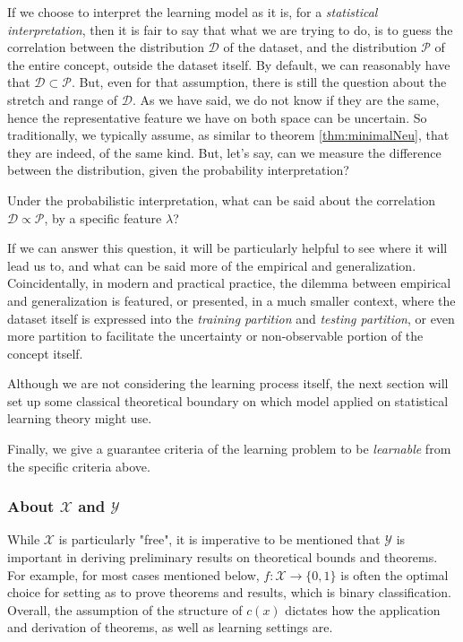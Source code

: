 If we choose to interpret the learning model as it is, for a \textit{statistical interpretation}, then it is fair to say that what we are trying to do, is to guess the correlation between the distribution $\mathcal{D}$ of the dataset, and the distribution $\mathcal{P}$ of the entire concept, outside the dataset itself. By default, we can reasonably have that $\mathcal{D}\subset \mathcal{P}$. But, even for that assumption, there is still the question about the stretch and range of $\mathcal{D}$. As we have said, we do not know if they are the same, hence the representative feature we have on both space can be uncertain. So traditionally, we typically assume, as similar to theorem \ref{thm:minimalNeu}, that they are indeed, of the same kind. But, let's say, can we measure the difference between the distribution, given the probability interpretation? 

\begin{question}
    Under the probabilistic interpretation, what can be said about the correlation $\mathcal{D}\propto \mathcal{P}$, by a specific feature $\lambda$?
\end{question}

If we can answer this question, it will be particularly helpful to see where it will lead us to, and what can be said more of the empirical and generalization. Coincidentally, in modern and practical practice, the dilemma between empirical and generalization is featured, or presented, in a much smaller context, where the dataset itself is expressed into the \textit{training partition} and \textit{testing partition}, or even more partition to facilitate the uncertainty or non-observable portion of the concept itself. 

Although we are not considering the learning process itself, the next section will set up some classical theoretical boundary on which model applied on statistical learning theory might use. 

Finally, we give a guarantee criteria of the learning problem to be \textit{learnable} from the specific criteria above. 
\subsubsection{About $\mathcal{X}$ and $\mathcal{Y}$}
While $\mathcal{X}$ is particularly "free", it is imperative to be mentioned that $\mathcal{Y}$ is important in deriving preliminary results on theoretical bounds and theorems. For example, for most cases mentioned below, $f: \mathcal{X}\to \{0,1\}$ is often the optimal choice for setting as to prove theorems and results, which is binary classification. Overall, the assumption of the structure of $c(x)$ dictates how the application and derivation of theorems, as well as learning settings are. 


